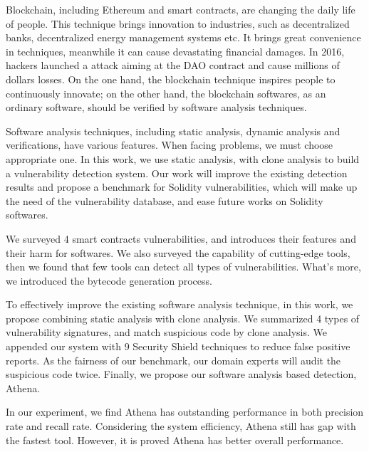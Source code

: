 \begin{enabstract}
Blockchain, including Ethereum and smart contracts, are changing the daily life of people. This technique brings innovation to industries, such as decentralized banks, decentralized energy management systems etc. It brings great convenience in techniques, meanwhile it can cause devastating financial damages. In 2016, hackers launched a attack aiming at the DAO contract and cause millions of dollars losses. On the one hand, the blockchain technique inspires people to continuously innovate; on the other hand, the blockchain softwares, as an ordinary software, should be verified by software analysis techniques.

Software analysis techniques, including static analysis, dynamic analysis and verifications, have various features. When facing problems, we must choose appropriate one. In this work, we use static analysis, with clone analysis to build a vulnerability detection system. Our work will improve the existing detection results and propose a benchmark for Solidity vulnerabilities, which will make up the need of the vulnerability database, and ease future works on Solidity softwares.

We surveyed 4 smart contracts vulnerabilities, and introduces their features and their harm for softwares. We also surveyed the capability of cutting-edge tools, then we found that few tools can detect all types of vulnerabilities. What's more, we introduced the bytecode generation process.

To effectively improve the existing software analysis technique, in this work, we propose combining static analysis with clone analysis. We summarized 4 types of vulnerability signatures, and match suspicious code by clone analysis. We appended our system with 9 Security Shield techniques to reduce false positive reports. As the fairness of our benchmark, our domain experts will audit the suspicious code twice. Finally, we propose our software analysis based detection, Athena.

In our experiment, we find Athena has outstanding performance in both precision rate and recall rate. Considering the system efficiency, Athena still has gap with the fastest tool. However, it is proved Athena has better overall performance.

\end{enabstract}
